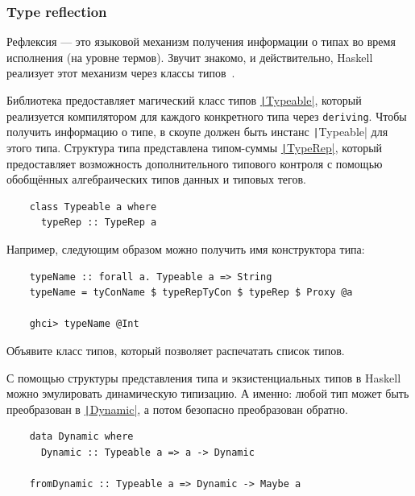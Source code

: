 
\subsubsection{Type reflection} \label{subsubsec:type-reflection}

Рефлексия --- это языковой механизм получения информации о типах во время исполнения (на уровне термов).
Звучит знакомо, и действительно, Haskell реализует этот механизм через классы типов~\cite{peyton2016reflection}.

Библиотека предоставляет магический класс типов \href{https://hackage.haskell.org/package/base-4.20.0.1/docs/Type-Reflection.html}{\texttt|Typeable|}, который реализуется компилятором для каждого конкретного типа через \texttt{deriving}.
Чтобы получить информацию о типе, в скоупе должен быть инстанс \texttt|Typeable| для этого типа.
Структура типа представлена типом-суммы \href{https://hackage.haskell.org/package/ghc-internal-9.1001.0/docs/src/GHC.Internal.Data.Typeable.Internal.html#TypeRep}{\texttt|TypeRep|}, который предоставляет возможность дополнительного типового контроля с помощью обобщённых алгебраических типов данных и типовых тегов.
\begin{verbatim}
    class Typeable a where
      typeRep :: TypeRep a
\end{verbatim}

Например, следующим образом можно получить имя конструктора типа:
\begin{verbatim}
    typeName :: forall a. Typeable a => String
    typeName = tyConName $ typeRepTyCon $ typeRep $ Proxy @a

    ghci> typeName @Int
\end{verbatim}

\begin{task}
    Объявите класс типов, который позволяет распечатать список типов.
\end{task}

С помощью структуры представления типа и экзистенциальных типов в Haskell можно эмулировать динамическую типизацию.
А именно: любой тип может быть преобразован в \href{}{\texttt|Dynamic|}, а потом безопасно преобразован обратно.
\begin{verbatim}
    data Dynamic where
      Dynamic :: Typeable a => a -> Dynamic

    fromDynamic :: Typeable a => Dynamic -> Maybe a
\end{verbatim}

